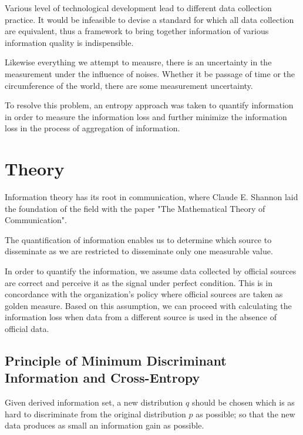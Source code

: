 \documentclass[nojss]{jss}
\begin{document}
Various level of technological development lead to different data
collection practice. It would be infeasible to devise a standard for
which all data collection are equivalent, thus a framework to bring
together information of various information quality is indispensible.

Likewise everything we attempt to meausre, there is an uncertainty in
the measurement under the influence of noises. Whether it be passage
of time or the circumference of the world, there are some measurement
uncertainty.


To resolve this problem, an entropy approach was taken to quantify
information in order to measure the information loss and further
minimize the information loss in the process of aggregation of
information.

\section{Theory}

Information theory has its root in communication, where Claude
E. Shannon laid the foundation of the field with the paper "The
Mathematical Theory of Communication". 

The quantification of information enables us to determine which source
to disseminate as we are restricted to disseminate only one measurable
value.

In order to quantify the information, we assume data collected by
official sources are correct and perceive it as the signal under
perfect condition. This is in concordance with the organization's
policy where official sources are taken as golden measure. Based on
this assumption, we can proceed with calculating the information loss
when data from a different source is used in the absence of official
data.


\subsection{Principle of Minimum Discriminant Information and Cross-Entropy}

Given derived information set, a new distribution $q$ should be chosen
which is as hard to discriminate from the original distribution $p$ as
possible; so that the new data produces as small an information gain
as possible.
\end{document}
